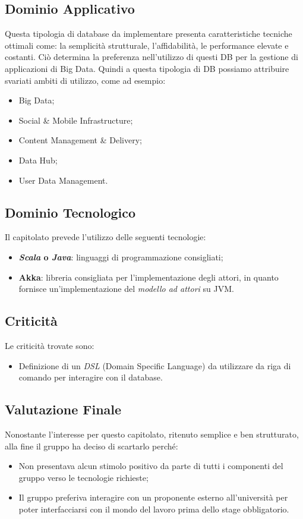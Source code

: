 \subsection{Dominio Applicativo}
Questa tipologia di database da implementare presenta caratteristiche tecniche ottimali come: la semplicità strutturale, l'affidabilità, le performance elevate e costanti.
Ciò determina la preferenza nell'utilizzo di questi DB per la gestione di applicazioni di Big Data.
Quindi a questa tipologia di DB possiamo attribuire svariati ambiti di utilizzo, come ad esempio:
\begin{itemize}
\item Big Data;
\item Social \& Mobile Infrastructure;
\item Content Management \& Delivery;
\item Data Hub;
\item User Data Management.
\end{itemize}

\subsection{Dominio Tecnologico}
Il capitolato prevede l'utilizzo delle seguenti tecnologie:
\begin{itemize}
\item \textbf{\textit{Scala} o \textit{Java}}: linguaggi di programmazione consigliati;
\item \textbf{Akka}: libreria consigliata per l'implementazione degli attori, in quanto fornisce un'implementazione del \textit{modello ad attori} su JVM.
\end{itemize}

\subsection{Criticità}
Le criticità trovate sono:
\begin{itemize}
\item Definizione di un \textit{DSL} (Domain Specific Language) da utilizzare da riga di comando per interagire con il database.
\end{itemize}

\subsection{Valutazione Finale}
Nonostante l'interesse per questo capitolato, ritenuto semplice e ben strutturato, alla fine il gruppo ha deciso di scartarlo perché:
\begin{itemize}
\item Non presentava alcun stimolo positivo da parte di tutti i componenti del gruppo verso le tecnologie richieste;
\item Il gruppo preferiva interagire con un proponente esterno all'università per poter interfacciarsi con il mondo del lavoro prima dello stage obbligatorio.
\end{itemize}
